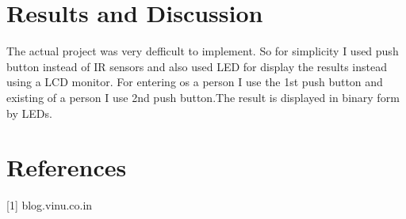 \documentclass{article}
\begin{document}
\section{Results and Discussion}
The actual project was very defficult to implement. So for simplicity I used push button instead of IR sensors and also used LED for display the results instead using a LCD monitor. For entering os a person I use the 1st push button and existing of a person I use 2nd push button.The result is displayed in binary form by LEDs. 

\section*{References}
[1] blog.vinu.co.in 
\end{document}
